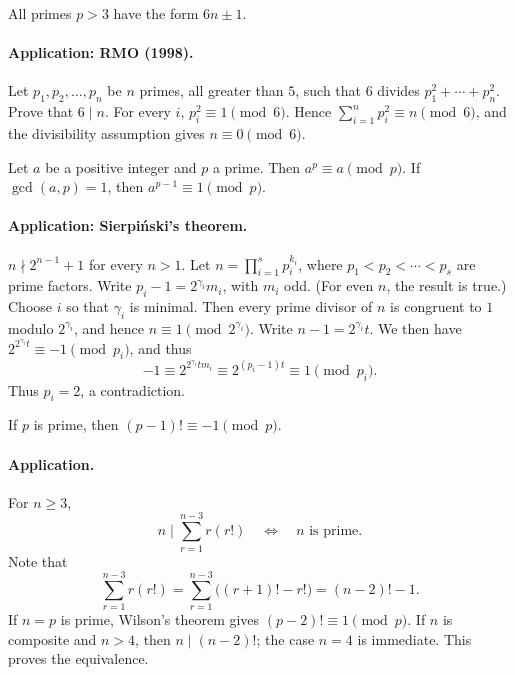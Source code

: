 \documentclass[11pt,a4paper]{article}
\begin{document}
\setcounter{theorem}{4}\begin{lemma}
All primes $p>3$ have the form $6n\pm1$.
\end{lemma}
\paragraph{Application: RMO (1998).}
Let $p_1,p_2,\ldots,p_n$ be $n$ primes, all greater than $5$, such that
$6$ divides $p_1^2+\cdots+p_n^2$. Prove that $6\mid n$.
For every $i$, $p_i^2\equiv1\pmod6$. Hence
$\sum_{i=1}^n p_i^2\equiv n\pmod6$, and the divisibility assumption gives $n\equiv0\pmod6$.

\setcounter{theorem}{5}\begin{lemma}
Let $a$ be a positive integer and $p$ a prime. Then $a^p\equiv a\pmod p$.
If $\gcd(a,p)=1$, then $a^{p-1}\equiv1\pmod p$.
\end{lemma}
\paragraph{Application: Sierpi\'nski's theorem.}
$n\nmid 2^{n-1}+1$ for every $n>1$.
Let $n=\prod_{i=1}^s p_i^{k_i}$, where $p_1<p_2<\cdots<p_s$ are prime factors.
Write $p_i-1=2^{\gamma_i}m_i$, with $m_i$ odd. (For even $n$, the result is true.)
Choose $i$ so that $\gamma_i$ is minimal. Then every prime divisor of $n$ is
congruent to $1$ modulo $2^{\gamma_i}$, and hence
$n\equiv1\pmod{2^{\gamma_i}}$. Write $n-1=2^{\gamma_i}t$.
We then have $2^{2^{\gamma_i}t}\equiv-1\pmod{p_i}$, and thus
\[
-1\equiv2^{2^{\gamma_i}tm_i}\equiv2^{(p_i-1)t}\equiv1\pmod{p_i}.
\]
Thus $p_i=2$, a contradiction.

\setcounter{theorem}{6}\begin{lemma}
If $p$ is prime, then $(p-1)!\equiv-1\pmod p$.
\end{lemma}
\paragraph{Application.}
For $n\geq3$,
\[
n\mid\sum_{r=1}^{n-3}r(r!)
\quad\Longleftrightarrow\quad n\text{ is prime}.
\]
Note that
\[
\sum_{r=1}^{n-3}r(r!)
=\sum_{r=1}^{n-3}\bigl((r+1)!-r!\bigr)=(n-2)!-1.
\]
If $n=p$ is prime, Wilson's theorem gives $(p-2)!\equiv1\pmod p$.
If $n$ is composite and $n>4$, then $n\mid(n-2)!$; the case $n=4$ is immediate.
This proves the equivalence.
\end{document}
